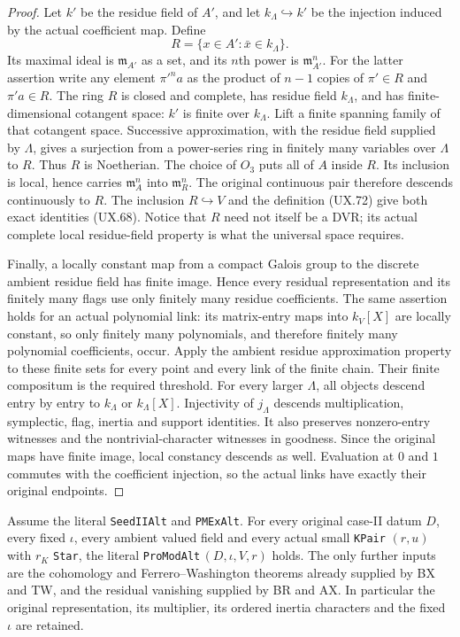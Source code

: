 \begin{proof}
Let $k'$ be the residue field of $A'$, and let
$k_\Lambda\hookrightarrow k'$ be the injection
induced by the actual coefficient map.  Define
\[
 R=\{x\in A':\bar x\in k_\Lambda\}.
 \tag{UX.72}
\]
Its maximal ideal is $\mathfrak m_{A'}$ as a set,
and its $n$th power is $\mathfrak m_{A'}^n$.
For the latter assertion write any element
$\pi'^na$ as the product of $n-1$ copies of
$\pi'\in R$ and $\pi'a\in R$.
The ring $R$ is closed and complete, has residue
field $k_\Lambda$, and has finite-dimensional
cotangent space: $k'$ is finite over $k_\Lambda$.
Lift a finite spanning family of that cotangent
space.  Successive approximation, with the residue
field supplied by $\Lambda$, gives a surjection
from a power-series ring in finitely many variables
over $\Lambda$ to $R$.  Thus $R$ is Noetherian.
The choice of $O_3$ puts all of $A$ inside $R$.
Its inclusion is local, hence carries
$\mathfrak m_A^n$ into $\mathfrak m_R^n$.
The original continuous pair therefore descends
continuously to $R$.  The inclusion $R\hookrightarrow V$
and the definition (UX.72) give both exact identities
(UX.68).  Notice that $R$ need not itself be a DVR;
its actual complete local residue-field property is
what the universal space requires.

Finally, a locally constant map from a compact Galois
group to the discrete ambient residue field has finite
image.  Hence every residual representation and its
finitely many flags use only finitely many residue
coefficients.  The same assertion holds for an actual
polynomial link: its matrix-entry maps into
$k_V[X]$ are locally constant, so only finitely many
polynomials, and therefore finitely many polynomial
coefficients, occur.  Apply the ambient residue
approximation property to these finite sets for
every point and every link of the finite chain.
Their finite compositum is the required threshold.
For every larger $\Lambda$, all objects descend
entry by entry to $k_\Lambda$ or $k_\Lambda[X]$.
Injectivity of $j_\Lambda$ descends multiplication,
symplectic, flag, inertia and support identities.
It also preserves nonzero-entry witnesses and the
nontrivial-character witnesses in goodness.  Since
the original maps have finite image, local constancy
descends as well.  Evaluation at $0$ and $1$ commutes
with the coefficient injection, so the actual links
have exactly their original endpoints.
\end{proof}

\begin{theorem}
Assume the literal \texttt{SeedIIAlt} and
\texttt{PMExAlt}.  For every original case-II datum
$D$, every fixed $\iota$, every ambient valued field
and every actual small \texttt{KPair} $(r,u)$ with
$r_K$ \texttt{Star}, the literal
\texttt{ProModAlt}$\,(D,\iota,V,r)$ holds.
The only further inputs are the cohomology and
Ferrero--Washington theorems already supplied by
BX and TW, and the residual vanishing supplied
by BR and AX.  In particular the original
representation, its multiplier, its ordered inertia
characters and the fixed $\iota$ are retained.
\end{theorem}

